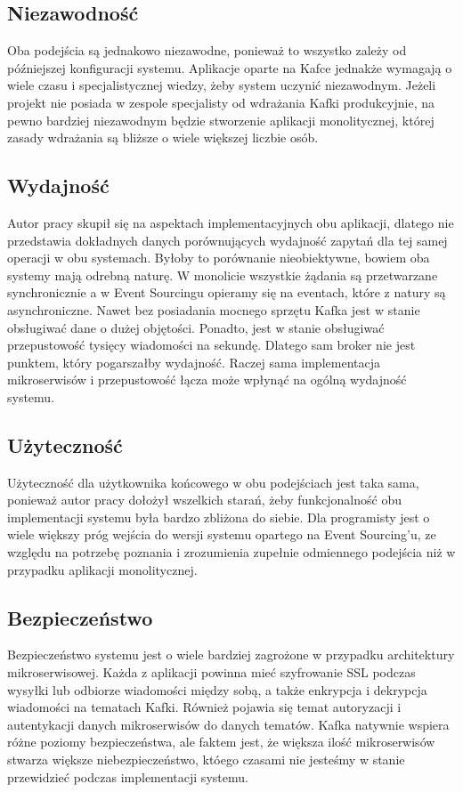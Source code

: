 \subsection{Niezawodność}
Oba podejścia są jednakowo niezawodne, ponieważ to wszystko zależy od późniejszej konfiguracji systemu. Aplikacje oparte na Kafce jednakże wymagają o wiele czasu i specjalistycznej wiedzy, żeby system uczynić niezawodnym. Jeżeli projekt nie posiada w zespole specjalisty od wdrażania Kafki produkcyjnie, na pewno bardziej niezawodnym będzie stworzenie aplikacji monolitycznej, której zasady wdrażania są bliższe o wiele większej liczbie osób.

\subsection{Wydajność}
Autor pracy skupił się na aspektach implementacyjnych obu aplikacji, dlatego nie przedstawia dokładnych danych porównujących wydajność zapytań dla tej samej operacji w obu systemach. Byłoby to porównanie nieobiektywne, bowiem oba systemy mają odrebną naturę. W monolicie wszystkie żądania są przetwarzane synchronicznie a w Event Sourcingu opieramy się na eventach, które z natury są asynchroniczne. Nawet bez posiadania mocnego sprzętu Kafka jest w stanie obsługiwać dane o dużej objętości. Ponadto, jest w stanie obsługiwać przepustowość tysięcy wiadomości na sekundę. Dlatego sam broker nie jest punktem, który pogarszałby wydajność. Raczej sama implementacja mikroserwisów i przepustowość łącza może wpłynąć na ogólną wydajność systemu.

\subsection{Użyteczność}
Użyteczność dla użytkownika końcowego w obu podejściach jest taka sama, ponieważ autor pracy dołożył wszelkich starań, żeby funkcjonalność obu implementacji systemu była bardzo zbliżona do siebie. 
Dla programisty jest o wiele większy próg wejścia do wersji systemu opartego na Event Sourcing'u, ze względu na potrzebę poznania i zrozumienia zupełnie odmiennego podejścia niż w przypadku aplikacji monolitycznej.

\subsection{Bezpieczeństwo}
Bezpieczeństwo systemu jest o wiele bardziej zagrożone w przypadku architektury mikroserwisowej. Każda z aplikacji powinna mieć szyfrowanie SSL podczas wysyłki lub odbiorze wiadomości między sobą, a także enkrypcja i dekrypcja wiadomości na tematach Kafki. Również pojawia się temat autoryzacji i autentykacji danych mikroserwisów do danych tematów. Kafka natywnie wspiera różne poziomy bezpieczeństwa, ale faktem jest, że większa ilość mikroserwisów stwarza większe niebezpieczeństwo, któego czasami nie jesteśmy w stanie przewidzieć podczas implementacji systemu.

